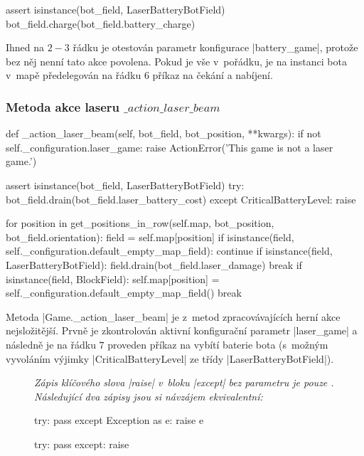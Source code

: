 {\begin{code}[caption={Metoda $Game.\_action\_wait$},label={lst:game-action-wait}]
    assert isinstance(bot_field, LaserBatteryBotField)
    bot_field.charge(bot_field.battery_charge)
\end{code}

Ihned na $2-3$ řádku je otestován parametr konfigurace \ic|battery_game|, protože bez něj nenní tato akce povolena. Pokud je vše v~pořádku, je na instanci bota v~mapě předelegován na řádku $6$ příkaz na čekání a nabíjení.

\subsubsection{Metoda akce laseru $\_action\_laser\_beam$}
\label{subsubsec:method-action-laser-beam}

\begin{code}[caption={Metoda $Game.\_action\_laser\_beam$},label={lst:game-action-laser-beam}]
def _action_laser_beam(self, bot_field, bot_position, **kwargs):
    if not self._configuration.laser_game:
        raise ActionError('This game is not a laser game.')

    assert isinstance(bot_field, LaserBatteryBotField)
    try:
        bot_field.drain(bot_field.laser_battery_cost)
    except CriticalBatteryLevel:
        raise

    for position in get_positions_in_row(self.map, bot_position, bot_field.orientation):
        field = self.map[position]
        if isinstance(field, self._configuration.default_empty_map_field):
            continue
        if isinstance(field, LaserBatteryBotField):
            field.drain(bot_field.laser_damage)
            break
        if isinstance(field, BlockField):
            self.map[position] = self._configuration.default_empty_map_field()
            break
\end{code}

Metoda \ic|Game._action_laser_beam| je z~metod zpracovávajících herní akce nejsložitější. Prvně je zkontrolován aktivní konfigurační parametr \ic|laser_game| a následně je na řádku $7$ proveden příkaz na vybítí baterie bota (s~možným vyvoláním výjimky \ic|CriticalBatteryLevel| ze třídy \ic|LaserBatteryBotField|).
}
\begin{figure}
    {\itshape
    Zápis klíčového slova \ic|raise| v~bloku \ic|except| bez parametru je pouze \footnotemark. Následující dva zápisy jsou si návzájem ekvivalentní:
    }
    \begin{minipage}[t][50\lineheight]{.47\textwidth}
    
    \begin{code}
try:
    pass
except Exception as e:
    raise e
    \end{code}
    \end{minipage}
    \hfill
    \begin{minipage}[t][50\lineheight]{.47\textwidth}
    
    \begin{code}
try:
    pass
except:
    raise
    \end{code}
    \end{minipage}
    
\end{figure}
